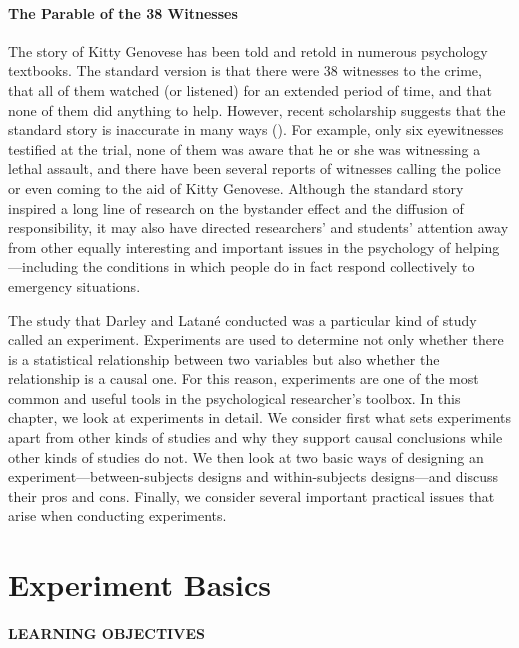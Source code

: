 \documentclass[
]{krantz}
\begin{document}
\paragraph*{The Parable of the 38 Witnesses}\label{the-parable-of-the-38-witnesses}

The story of Kitty Genovese has been told and retold in numerous psychology textbooks. The standard version is that there were 38 witnesses to the crime, that all of them watched (or listened) for an extended period of time, and that none of them did anything to help. However, recent scholarship suggests that the standard story is inaccurate in many ways (). For example, only six eyewitnesses testified at the trial, none of them was aware that he or she was witnessing a lethal assault, and there have been several reports of witnesses calling the police or even coming to the aid of Kitty Genovese. Although the standard story inspired a long line of research on the bystander effect and the diffusion of responsibility, it may also have directed researchers' and students' attention away from other equally interesting and important issues in the psychology of helping---including the conditions in which people do in fact respond collectively to emergency situations.

The study that Darley and Latané conducted was a particular kind of study called an experiment. Experiments are used to determine not only whether there is a statistical relationship between two variables but also whether the relationship is a causal one. For this reason, experiments are one of the most common and useful tools in the psychological researcher's toolbox. In this chapter, we look at experiments in detail. We consider first what sets experiments apart from other kinds of studies and why they support causal conclusions while other kinds of studies do not. We then look at two basic ways of designing an experiment---between-subjects designs and within-subjects designs---and discuss their pros and cons. Finally, we consider several important practical issues that arise when conducting experiments.

\section{Experiment Basics}\label{experiment-basics}

\paragraph*{LEARNING OBJECTIVES}\label{learning-objectives-6}
\end{document}
